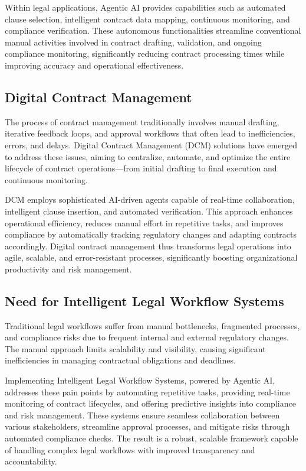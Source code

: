 Within legal applications, Agentic AI provides capabilities such as automated clause selection, intelligent contract data mapping, continuous monitoring, and compliance verification. These autonomous functionalities streamline conventional manual activities involved in contract drafting, validation, and ongoing compliance monitoring, significantly reducing contract processing times while improving accuracy and operational effectiveness.

\subsection{Digital Contract Management}
The process of contract management traditionally involves manual drafting, iterative feedback loops, and approval workflows that often lead to inefficiencies, errors, and delays. Digital Contract Management (DCM) solutions have emerged to address these issues, aiming to centralize, automate, and optimize the entire lifecycle of contract operations—from initial drafting to final execution and continuous monitoring.\mynewline

DCM employs sophisticated AI-driven agents capable of real-time collaboration, intelligent clause insertion, and automated verification. This approach enhances operational efficiency, reduces manual effort in repetitive tasks, and improves compliance by automatically tracking regulatory changes and adapting contracts accordingly. Digital contract management thus transforms legal operations into agile, scalable, and error-resistant processes, significantly boosting organizational productivity and risk management.

\subsection{Need for Intelligent Legal Workflow Systems}
Traditional legal workflows suffer from manual bottlenecks, fragmented processes, and compliance risks due to frequent internal and external regulatory changes. The manual approach limits scalability and visibility, causing significant inefficiencies in managing contractual obligations and deadlines.\mynewline

Implementing Intelligent Legal Workflow Systems, powered by Agentic AI, addresses these pain points by automating repetitive tasks, providing real-time monitoring of contract lifecycles, and offering predictive insights into compliance and risk management. These systems ensure seamless collaboration between various stakeholders, streamline approval processes, and mitigate risks through automated compliance checks. The result is a robust, scalable framework capable of handling complex legal workflows with improved transparency and accountability.

